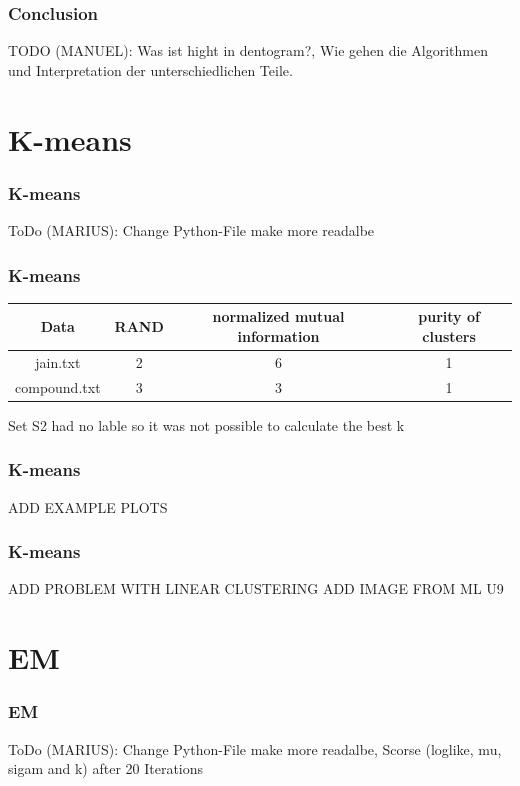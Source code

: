 \documentclass[xcolor={usenames,dvipsnames}, 
	hyperref={
	colorlinks=true, 						%
	linkcolor=black, 						%
	urlcolor=black,							%
	citecolor=black,						%
	pdfpagelabels=false,
	},
	ignorenonframetext,			%
	compress					%
]{beamer}
\begin{document}
\begin{frame}
   \frametitle{Conclusion}
TODO (MANUEL): Was ist hight in dentogram?, Wie gehen die Algorithmen und Interpretation der unterschiedlichen Teile.
\end{frame}



\section{K-means}
\begin{frame}
   \frametitle{K-means}
    


ToDo (MARIUS): Change Python-File make more readalbe

\end{frame}

\begin{frame}
   \frametitle{K-means}
\begin{center}
  \begin{tabular}{ c | c | c | c }
    Data & RAND & normalized mutual information & purity of clusters \\ 
    \hline
    jain.txt & 2 & 6 & 1 \\
    compound.txt & 3 & 3 & 1 \\
  \end{tabular}

  Set S2 had no lable so it was not possible to calculate the best k
\end{center}
\end{frame}

\begin{frame}
   \frametitle{K-means}
ADD EXAMPLE PLOTS
\end{frame}

\begin{frame}
   \frametitle{K-means}
ADD PROBLEM WITH LINEAR CLUSTERING ADD IMAGE FROM ML U9
\end{frame}


\section{EM}
\begin{frame}
   \frametitle{EM}


ToDo (MARIUS): Change Python-File make more readalbe, Scorse (loglike, mu, sigam and k) after 20 Iterations
\end{frame}
\end{document}
